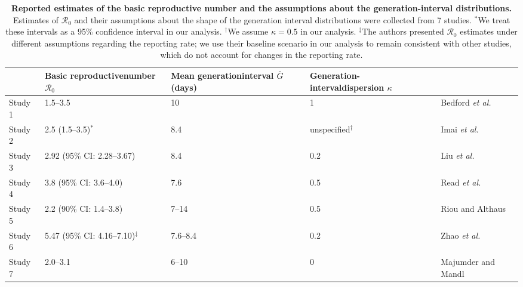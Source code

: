 \documentclass[12pt]{article}
\newcommand{\Ro}{\ensuremath{{\mathcal R}_{0}}\xspace}
\begin{document}
\begin{table}[t]
\begin{center}
\scriptsize
\begin{tabular}{l|p{3.5cm}|p{2.5cm}|p{2.7cm}|l}
 & Basic reproductive\newline number \Ro & Mean generation\newline interval $\bar G$ (days) & Generation-interval\newline dispersion $\kappa$ & \\
\hline
Study 1 & 1.5--3.5 & 10 & 1 & Bedford \textit{et al.} \cite{bedfordncov} \\
\hline
Study 2 & 2.5 (1.5--3.5)$^\ast$ & 8.4 & unspecified$^\dagger$ & Imai \textit{et al.} \cite{imaincov} \\
\hline
Study 3 & 2.92 (95\% CI: 2.28--3.67) & 8.4 & 0.2 & Liu \textit{et al.} \cite{liuncov} \\
\hline
Study 4 & 3.8 (95\% CI: 3.6--4.0) & 7.6 & 0.5 & Read \textit{et al.} \cite{readncov} \\
\hline
Study 5 & 2.2 (90\% CI: 1.4--3.8) & 7--14 & 0.5 & Riou and Althaus \cite{riouncov} \\
\hline
Study 6 & 5.47 (95\% CI: 4.16--7.10)$^\ddagger$ & 7.6--8.4 & 0.2 & Zhao \textit{et al.} \cite{zhaoncov} \\
\hline
Study 7 & 2.0--3.1 & 6--10 & 0 & Majumder and Mandl \cite{majumderncov} \\
\hline
\end{tabular}
\end{center}
\caption{
\textbf{Reported estimates of the basic reproductive number and the assumptions about the generation-interval distributions.}
Estimates of \Ro and their assumptions about the shape of the generation interval distributions were collected from 7 studies.
$^\ast$We treat these intervals as a 95\% confidence interval in our analysis.
$^\dagger$We assume $\kappa = 0.5$ in our analysis.
$^\ddagger$The authors presented \Ro estimates under different assumptions regarding the reporting rate; we use their baseline scenario in our analysis to remain consistent with other studies, which do not account for changes in the reporting rate.
}
\end{table}
\end{document}
